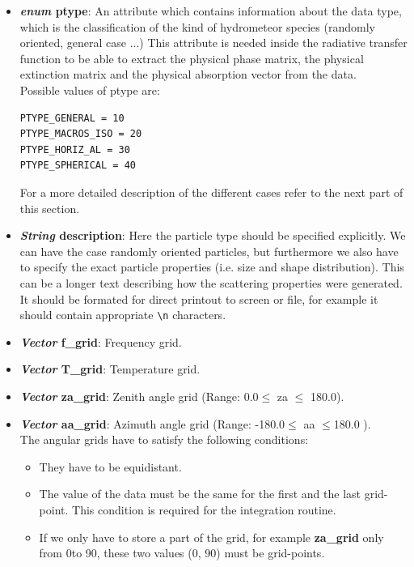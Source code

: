 \begin{itemize}
\item {\bf {\sl enum} ptype}: An attribute which contains information about
  the data type, which is the classification of the kind of hydrometeor species (randomly
  oriented, general case ...) This attribute is needed inside the
  radiative transfer function to be able to extract the physical phase
  matrix, the physical
  extinction matrix  and the physical absorption vector from the data.\\
  
  Possible values of ptype are:
\begin{verbatim}
PTYPE_GENERAL = 10
PTYPE_MACROS_ISO = 20
PTYPE_HORIZ_AL = 30
PTYPE_SPHERICAL = 40
\end{verbatim}
  
  For a more detailed description of the different cases refer to the
  next part of this section.
  
\item {\bf {\sl String} description}: Here the particle type should be
  specified explicitly. We can have the case randomly oriented
  particles, but furthermore we also have to specify the exact
  particle properties (i.e. size and shape distribution). This can be
  a longer text describing how the scattering properties were
  generated. It should be formated for direct printout to screen or
  file, for example it should contain appropriate {\verb "\n" }
  characters. 
    
\item {\bf {\sl Vector} f\_grid}: Frequency grid.

\item {\bf {\sl Vector} T\_grid}: Temperature grid. 

\item {\bf {\sl Vector} za\_grid}: Zenith angle grid (Range: 0.0\degree $\le$ za
  $\le$ 180.0\degree ).
  
  

\item {\bf {\sl Vector} aa\_grid}: Azimuth angle grid (Range: -180.0\degree $\le$ aa $\le$180.0 \degree).\\
  \vspace*{1ex} The angular grids have to satisfy the following
  conditions:
\begin{itemize}
\item They have to be equidistant.
\item The value of the data must be the same for the first and the
  last grid-point. This condition is required for the integration
  routine.
\item If we only have to store a part of the grid, for example {\bf
    za\_grid} only from 0\degree to 90\degree, these two values (0\degree, 90\degree) must be
  grid-points.
\end{itemize}




\end{itemize}
